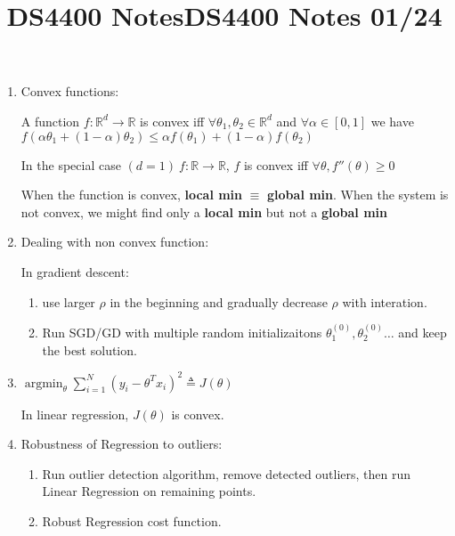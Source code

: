 \documentclass[12pt]{article}
\title{DS4400 Notes}
\date{}
\author{}
\DeclareMathOperator*{\argmin}{\arg\min}
\begin{document}
    \maketitle

        \title{DS4400 Notes 01/24}
        \maketitle
        \begin{enumerate}
            \item Convex functions:
            
            A function $f:\mathbb{R}^d \rightarrow \mathbb{R}$ is convex iff $\forall \theta_1, \theta_2 \in \mathbb{R}^d $ and $\forall \alpha \in [0,1]$ we have 
            $f(\alpha\theta_1 + (1-\alpha)\theta_2) \le \alpha f(\theta_1) + (1-\alpha)f(\theta_2)$
    
            In the special case $(d=1) \ f:\mathbb{R}\rightarrow \mathbb{{R}}$, $f$ is convex iff $\forall \theta, f''(\theta) \ge 0$

            When the function is convex, \textbf{local min} $\equiv$ \textbf{global min}. When the system is not convex, we might find only a \textbf{local min} but not a \textbf{global min}

            \item Dealing with non convex function:
            
            In gradient descent: 
            \begin{enumerate}
                \item use larger $\rho$ in the beginning and gradually decrease $\rho$ with interation.
                \item Run SGD/GD with multiple random initializaitons $\theta_1^{(0)}, \theta_2^{(0)} \dots $ and keep the best solution.
            \end{enumerate}

            \item $\argmin_{\theta} \sum_{i = 1}^N (y_i - \theta^Tx_i)^2 \triangleq J(\theta)$ 
            
            In linear regression, $J(\theta)$ is convex.

            \item Robustness of Regression to outliers:
            
            \begin{enumerate}
                \item Run outlier detection algorithm, remove detected outliers, then run Linear Regression on remaining points.
                \item Robust Regression cost function.
                

\end{enumerate}
\end{enumerate}
\end{document}
